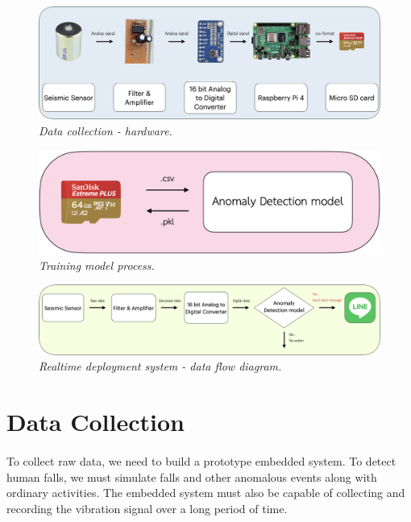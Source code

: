 \begin{figure}[H]
  \centering
  \caption[Data collection - hardware.]{\emph{Data collection - hardware.}}\label{fig:data_collection}
  \includegraphics[scale = 0.13]{figures/meth_data_collection.jpg}  
\end{figure}

\begin{figure}[H]
  \centering
  \caption[Training model process.]{\emph{Training model process.}}\label{fig:training}
  \includegraphics[scale = 0.2]{figures/meth_training.jpg}  
\end{figure}

\begin{figure}[H]
  \centering
  \caption[Realtime deployment system - data flow diagram.]{\emph{Realtime deployment system - data flow diagram.}}\label{fig:deploy_data_flow}
  \includegraphics[scale = 0.13]{figures/meth_deploy.jpg}  
\end{figure}




\section{Data Collection}
\paragraph{}
To collect raw data, we need to build a prototype embedded system. To detect human falls, we must simulate falls and other anomalous events along with ordinary activities. The embedded system must also be capable of collecting and recording the vibration signal over a long period of time.

